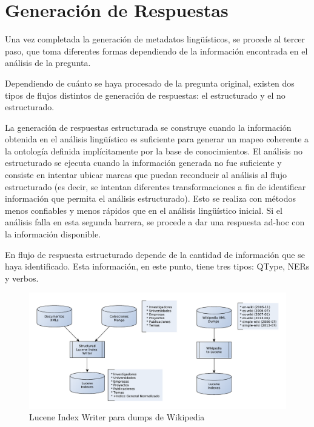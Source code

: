 \section{Generaci\'on de Respuestas}

Una vez completada la generaci\'on de
metadatos ling\"u\'isticos, se procede al tercer paso, que toma
diferentes formas dependiendo de la informaci\'on encontrada en el
an\'alisis de la pregunta.


Dependiendo de cu\'anto se haya procesado de la pregunta original,
existen dos tipos de flujos distintos de generaci\'on de respuestas: el
estructurado y el no estructurado.

La generaci\'on de respuestas estructurada se construye cuando la
informaci\'on obtenida en el an\'alisis ling\"u\'istico es suficiente
para generar un mapeo coherente a la ontolog\'ia definida
impl\'icitamente por la base de conocimientos. El an\'alisis no
estructurado se ejecuta cuando la informaci\'on generada no fue
suficiente y consiste en intentar ubicar marcas que puedan reconducir
al an\'alisis al flujo estructurado (es decir, se intentan diferentes
transformaciones a fin de identificar informaci\'on que permita el
an\'alisis estructurado). Esto se realiza con m\'etodos menos
confiables y menos r\'apidos que en el an\'alisis ling\"u\'istico
inicial. Si el an\'alisis falla en esta segunda barrera, se procede a
dar una respuesta ad-hoc con la informaci\'on disponible. 

En flujo de respuesta estructurado depende de la cantidad de
informaci\'on que se haya identificado. Esta informaci\'on, en este
punto, tiene tres tipos: QType, NERs y verbos. 



\begin{figure}
  \centering
    \includegraphics[scale=0.86]{graficos/LuceneWritersJuntos}
  \caption{Lucene Index Writer para dumps de Wikipedia}
  \label{fig:LuceneIndexWriterWiki}
\end{figure}


